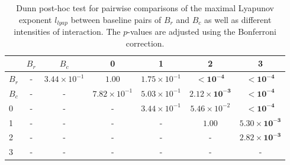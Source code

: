 \begin{table}
\centering
\caption{Dunn post-hoc test for pairwise comparisons of the maximal Lyapunov exponent $l_{lyap}$ between baseline pairs of $B_r$ and $B_c$ as well as different intensities of interaction. The $p$-values are adjusted using the Bonferroni correction.}
\label{tab:dunn_lyapunov}
\begin{tabular}{lcccccc}
\toprule
 & $B_r$ & $B_c$ & 0 & 1 & 2 & 3 \\
\midrule
$B_r$ & - & $3.44 \times 10^{-1}$ & $1.00$ & $1.75 \times 10^{-1}$ & $\mathbf{< 10^{-4}}$ & $\mathbf{< 10^{-4}}$ \\
$B_c$ & - & - & $7.82 \times 10^{-1}$ & $5.03 \times 10^{-1}$ & $\mathbf{2.12 \times 10^{-3}}$ & $\mathbf{< 10^{-4}}$ \\
0 & - & - & - & $3.44 \times 10^{-1}$ & $5.46 \times 10^{-2}$ & $\mathbf{< 10^{-4}}$ \\
1 & - & - & - & - & $1.00$ & $\mathbf{5.30 \times 10^{-3}}$ \\
2 & - & - & - & - & - & $\mathbf{2.82 \times 10^{-3}}$ \\
3 & - & - & - & - & - & - \\
\bottomrule
\end{tabular}
\end{table}
